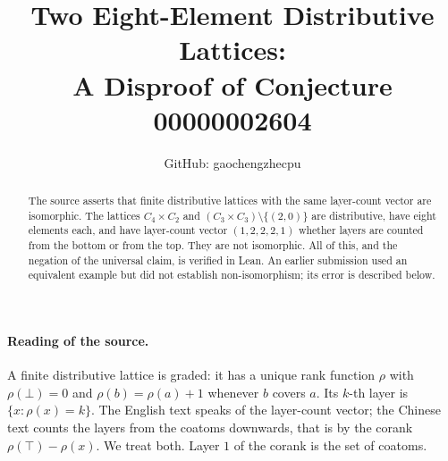 \documentclass[11pt]{article}
\title{Two Eight-Element Distributive Lattices:\\A Disproof of Conjecture 00000002604}
\author{GitHub: gaochengzhecpu}
\date{}
\theoremstyle{remark}
\begin{document}
\maketitle
\begin{abstract}
The source asserts that finite distributive lattices with the same
layer-count vector are isomorphic. The lattices $C_4\times C_2$ and
$(C_3\times C_3)\setminus\{(2,0)\}$ are distributive, have eight
elements each, and have layer-count vector $(1,2,2,2,1)$ whether layers
are counted from the bottom or from the top. They are not isomorphic.
All of this, and the negation of the universal claim, is verified in
Lean. An earlier submission used an equivalent example but did not
establish non-isomorphism; its error is described below.
\end{abstract}

\paragraph{Reading of the source.}
A finite distributive lattice is graded: it has a unique rank function
$\rho$ with $\rho(\bot)=0$ and $\rho(b)=\rho(a)+1$ whenever $b$ covers
$a$. Its $k$-th layer is $\{x:\rho(x)=k\}$. The English text speaks of
the layer-count vector; the Chinese text counts the layers from the
coatoms downwards, that is by the corank $\rho(\top)-\rho(x)$. We treat
both. Layer $1$ of the corank is the set of coatoms.
\end{document}

